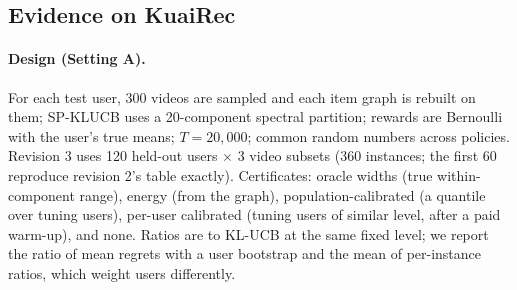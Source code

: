\documentclass[11pt]{article}
\theoremstyle{definition}
\theoremstyle{remark}
\begin{document}
\subsection{Evidence on KuaiRec}

\paragraph{Design (Setting A).} For each test user, 300 videos are sampled and each item graph is rebuilt on them; SP-KLUCB uses a 20-component spectral partition; rewards are Bernoulli with the user's true means; $T=20{,}000$; common random numbers across policies. Revision 3 uses 120 held-out users $\times$ 3 video subsets (360 instances; the first 60 reproduce revision 2's table exactly). Certificates: oracle widths (true within-component range), energy (from the graph), population-calibrated (a quantile over tuning users), per-user calibrated (tuning users of similar level, after a paid warm-up), and none. Ratios are to KL-UCB at the same fixed level; we report the ratio of mean regrets with a user bootstrap and the mean of per-instance ratios, which weight users differently.

\begin{table}[t]\centering\small
{}
\caption{The certificate gap (Setting A v2, 360 instances, KL bounds). All certified variants stay at or below 1.04$\times$ KL-UCB at the 90th percentile. In absolute terms Thompson sampling beats every fixed-level KL policy (oracle SP-KLUCB is 1.46$\times$ TS on I-mf), so claims are within the KL family.}\label{tab:certgap}
\end{table}
\end{document}
